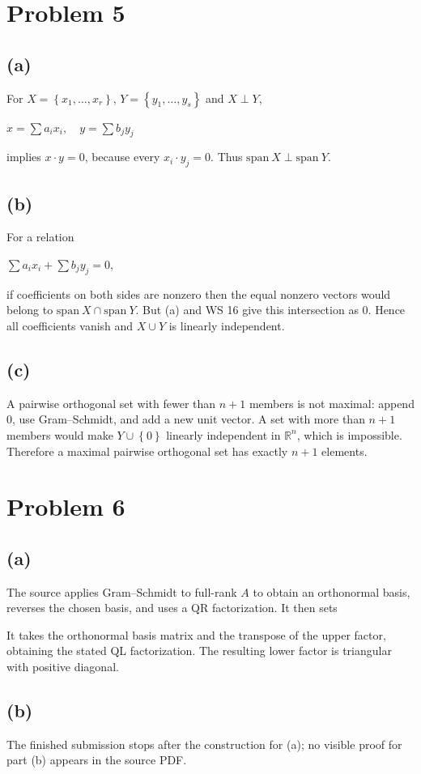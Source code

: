 \section{Problem 5}

\subsection{(a)}

For \(X = \left\{ {x_{1},\ldots,x_{r}} \right\}\), \(Y = \left\{ {y_{1},\ldots,y_{s}} \right\}\) and \(X \perp Y\),

\(x = \sum a_{i}x_{i},\quad y = \sum b_{j}y_{j}\)

implies \(x \cdot y = 0\), because every \(x_{i} \cdot y_{j} = 0\). Thus \(\text{span}\ X \perp \text{span}\ Y\).

\subsection{(b)}

For a relation

\(\sum a_{i}x_{i} + \sum b_{j}y_{j} = 0,\)

if coefficients on both sides are nonzero then the equal nonzero vectors would belong to \(\text{span}\ X \cap \text{span}\ Y\). But (a) and WS 16 give this intersection as \(0\). Hence all coefficients vanish and \(X \cup Y\) is linearly independent.

\subsection{(c)}

A pairwise orthogonal set with fewer than \(n + 1\) members is not maximal: append \(0\), use Gram--Schmidt, and add a new unit vector. A set with more than \(n + 1\) members would make \(Y \cup \left\{ 0 \right\}\) linearly independent in \(\mathbb{R}^{n}\), which is impossible. Therefore a maximal pairwise orthogonal set has exactly \(n + 1\) elements.

\section{Problem 6}

\subsection{(a)}

The source applies Gram--Schmidt to full-rank \(A\) to obtain an orthonormal basis, reverses the chosen basis, and uses a QR factorization. It then sets

It takes the orthonormal basis matrix and the transpose of the upper factor, obtaining the stated QL factorization. The resulting lower factor is triangular with positive diagonal.

\subsection{(b)}

The finished submission stops after the construction for (a); no visible proof for part (b) appears in the source PDF.
